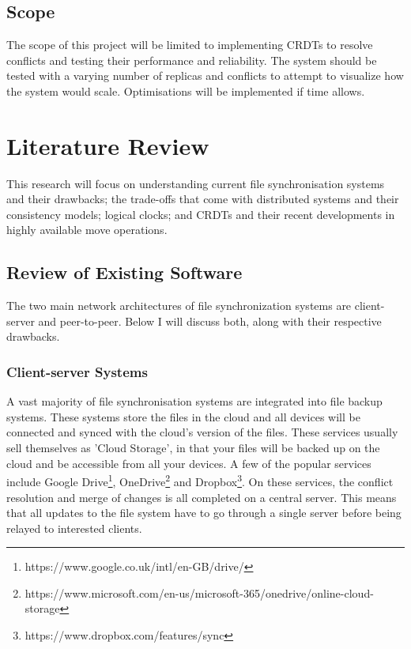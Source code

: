 \documentclass[12pt]{report}
\begin{document}
\section{Scope}
The scope of this project will be limited to implementing CRDTs to resolve conflicts and testing their performance and reliability. The system should be tested with a varying number of replicas and conflicts to attempt to visualize how the system would scale. Optimisations will be implemented if time allows.

\newpage
\chapter{Literature Review}
This research will focus on understanding current file synchronisation systems and their drawbacks; the trade-offs that come with distributed systems and their consistency models; logical clocks; and CRDTs and their recent developments in highly available move operations.

\section{Review of Existing Software}
The two main network architectures of file synchronization systems are client-server and peer-to-peer. Below I will discuss both, along with their respective drawbacks.


\subsection{Client-server Systems}
A vast majority of file synchronisation systems are integrated into file backup systems. These systems store the files in the cloud and all devices will be connected and synced with the cloud's version of the files. These services usually sell themselves as 'Cloud Storage', in that your files will be backed up on the cloud and be accessible from all your devices. A few of the popular services include Google Drive\footnote{https://www.google.co.uk/intl/en-GB/drive/}, OneDrive\footnote{https://www.microsoft.com/en-us/microsoft-365/onedrive/online-cloud-storage} and Dropbox\footnote{https://www.dropbox.com/features/sync}. On these services, the conflict resolution and merge of changes is all completed on a central server. This means that all updates to the file system have to go through a single server before being relayed to interested clients. \par
\end{document}
